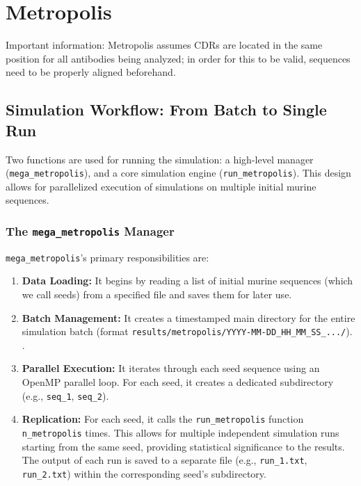 \section{Metropolis}
Important information:
Metropolis assumes CDRs are located in the same position for all antibodies being analyzed; in order for this to be valid, sequences
need to be properly aligned beforehand.

\subsection{Simulation Workflow: From Batch to Single Run}

Two functions are used for running the simulation: a high-level manager 
(\texttt{mega\_metropolis}), and a core simulation engine (\texttt{run\_metropolis}). 
This design allows for parallelized execution of simulations on multiple 
initial murine sequences.

\subsubsection{The \texttt{mega\_metropolis} Manager}

\texttt{mega\_metropolis}'s primary responsibilities are:

\begin{enumerate}
    \item \textbf{Data Loading:} It begins by reading a list of initial murine sequences 
        (which we call seeds) from a specified file and saves them for later use.
    \item \textbf{Batch Management:} It creates a timestamped main directory for the entire 
        simulation batch (format \texttt{results/metropolis/YYYY-MM-DD\_HH\_MM\_SS\_.../}). .
    \item \textbf{Parallel Execution:} It iterates through each seed sequence using an OpenMP parallel loop. 
    For each seed, it creates a dedicated subdirectory (e.g., \texttt{seq\_1}, \texttt{seq\_2}).
    \item \textbf{Replication:} For each seed, it calls the \texttt{run\_metropolis} function \texttt{n\_metropolis} times. 
        This allows for multiple independent simulation runs starting from the same seed, providing statistical 
        significance to the results. The output of each run is saved to a separate file (e.g., \texttt{run\_1.txt}, 
        \texttt{run\_2.txt}) within the corresponding seed's subdirectory.
\end{enumerate}

